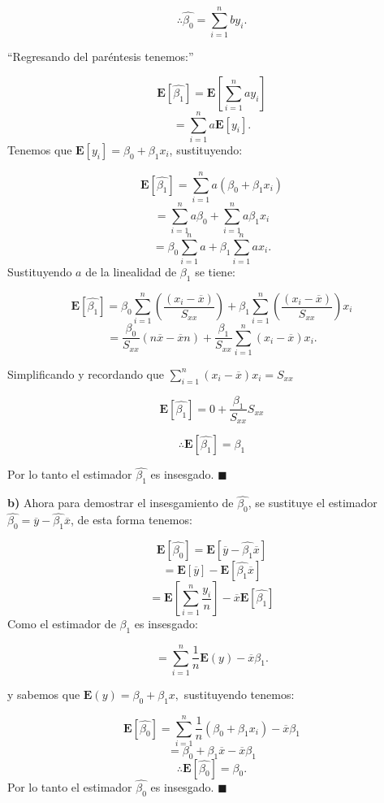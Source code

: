\documentclass[
  a4paper,
  oneside,
  openany]{book}
\begin{document}
\[\therefore \hat{\beta_{0}}=\sum_{i=1}^{n}by_{i}.\]

``Regresando del paréntesis tenemos:''

\[\mathbf{E}\left[\hat{\beta_{1}}\right]=\mathbf{E}\left[\sum_{i=1}^{n}ay_{i}\right]\]
\[=\sum_{i=1}^{n}a\mathbf{E}[y_{i}].\]
Tenemos que \(\mathbf{E}[y_{i}]=\beta_{0}+\beta_{1}x_{i}\), sustituyendo:

\[\mathbf{E}\left[\hat{\beta_{1}}\right]=\sum_{i=1}^{n}a(\beta_{0}+\beta_{1}x_{i})\]
\[=\sum_{i=1}^{n}a\beta_{0}+\sum_{i=1}^{n}a\beta_{1}x_{i}\]
\[=\beta_{0}\sum_{i=1}^{n}a+\beta_{1}\sum_{i=1}^{n}ax_{i}.\]
Sustituyendo \(a\) de la linealidad de \(\beta_{1}\) se tiene:

\[\mathbf{E}\left[\hat{\beta_{1}}\right]=\beta_{0}\sum_{i=1}^{n}\left(\frac{(x_{i}-\overline{x})}{S_{xx}}\right)+\beta_{1}\sum_{i=1}^{n}\left(\frac{(x_{i}-\overline{x})}{S_{xx}}\right)x_{i}\]
\[=\frac{\beta_{0}}{S_{xx}}(n\overline{x}-\overline{x}n)+\frac{\beta_{1}}{S_{xx}}\sum_{i=1}^{n}(x_{i}-\overline{x})x_{i}.\]

Simplificando y recordando que \(\sum_{i=1}^{n}(x_{i}-\overline{x})x_{i}=S_{xx}\)

\[\mathbf{E}\left[\hat{\beta_{1}}\right]=0+\frac{\beta_{1}}{S_{xx}}S_{xx}\]

\[\therefore \mathbf{E}\left[\hat{\beta_{1}}\right]=\beta_{1}\]

Por lo tanto el estimador \(\hat{\beta_{1}}\) es insesgado. \(\blacksquare\)

\textbf{b)} Ahora para demostrar el insesgamiento de \(\hat{\beta_{0}}\), se sustituye el estimador \(\hat{\beta_{0}}=\overline{y}-\hat{\beta_{1}}\overline{x}\), de esta forma tenemos:

\[\mathbf{E}\left[\hat{\beta_{0}}\right]=\mathbf{E}\left[\overline{y}-\hat{\beta_{1}}\overline{x}\right]\]
\[=\mathbf{E}\left[\overline{y}\right]-\mathbf{E}\left[\hat{\beta_{1}}\overline{x}\right]\]
\[=\mathbf{E}\left[\sum_{i=1}^{n}\frac{y_{i}}{n}\right]-\overline{x}\mathbf{E}\left[\hat{\beta_{1}}\right]\]
Como el estimador de \(\beta_{1}\) es insesgado:

\[=\sum_{i=1}^{n}\frac{1}{n}\mathbf{E}\left(y\right)-\overline{x}\beta_{1}.\]

y sabemos que \(\mathbf{E}(y)=\beta_{0}+\beta_{1}x,\) sustituyendo tenemos:

\[\mathbf{E}\left[\hat{\beta_{0}}\right]=\sum_{i=1}^{n}\frac{1}{n}(\beta_{0}+\beta_{1}x_{i})-\overline{x}\beta_{1}\]
\[=\beta_{0}+\beta_{1}\overline{x}-\overline{x}\beta_{1}\]
\[\therefore \mathbf{E}[\hat{\beta_{0}}]=\beta_{0}.\]
Por lo tanto el estimador \(\hat{\beta_{0}}\) es insesgado. \(\blacksquare\)
\end{document}
